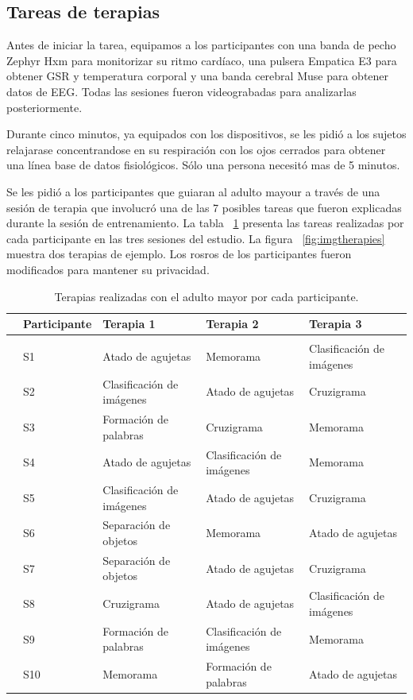 \subsection{Tareas de terapias}\label{secc:therapytasks}
Antes de iniciar la tarea, equipamos a los participantes con una banda de pecho Zephyr Hxm para monitorizar su ritmo card\'iaco, una pulsera Empatica E3 para obtener GSR y temperatura corporal y una banda cerebral Muse para obtener datos de EEG. Todas las sesiones fueron videograbadas para analizarlas posteriormente.

Durante cinco minutos, ya equipados con los dispositivos, se les pidi\'o a los sujetos relajarase concentrandose en su respiraci\'on con los ojos cerrados para obtener una l\'inea base de datos fisiol\'ogicos. S\'olo una persona necesit\'o mas de 5 minutos.

Se les pidi\'o a los participantes que guiaran al adulto mayour a trav\'es de una sesi\'on de terapia que involucr\'o una de las 7 posibles tareas que fueron explicadas durante la sesi\'on de entrenamiento. La tabla ~\ref{table:therapies} presenta las tareas realizadas por cada participante en las tres sesiones del estudio. La figura ~\ref{fig:imgtherapies} muestra dos terapias de ejemplo. Los rosros de los participantes fueron modificados para mantener su privacidad.

\begin{table}[h!]
	\footnotesize
	\centering
	\caption{Terapias realizadas con el adulto mayor por cada participante.}
	\label{table:therapies}
	\begin{tabular}{m{0.2cm}m{2.5cm}m{2.5cm}m{2.5cm}m{2.5cm}}
		\hline\noalign{\smallskip}
	&\textbf{Participante}&  \textbf{Terapia 1}& \textbf{Terapia 2}   & \textbf{Terapia 3}  \\ \hline
		\\ \noalign{\smallskip}
		&S1&  Atado de agujetas& Memorama & Clasificaci\'on de im\'agenes   \\ 
  &S2&  Clasificaci\'on de im\'agenes& Atado de agujetas & Cruzigrama   \\ 
  &S3&  Formaci\'on de palabras& Cruzigrama & Memorama    \\ 
  &S4&  Atado de agujetas& Clasificaci\'on de im\'agenes & Memorama   \\ 
  & S5&  Clasificaci\'on de im\'agenes&  Atado de agujetas & Cruzigrama   \\ 
  &S6&  Separaci\'on de objetos& Memorama & Atado de agujetas   \\ 
  &S7&  Separaci\'on de objetos & Atado de agujetas & Cruzigrama   \\ 
  &S8&  Cruzigrama& Atado de agujetas & Clasificaci\'on de im\'agenes   \\ 
  &S9&  Formaci\'on de palabras& Clasificaci\'on de im\'agenes & Memorama   \\ 
  &S10&  Memorama& Formaci\'on de palabras & Atado de agujetas   \\ 
		\hline
	\end{tabular}
\end{table}

